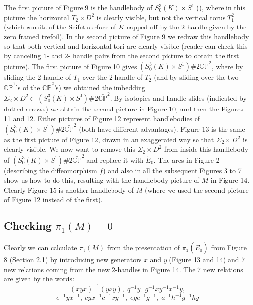 \documentclass[11pt]{amsart}
\begin{document}
The first picture of Figure 9 is the handlebody of $S^{3}_{0}(K) \times S^{1}$ (\cite{a2}), where in this picture the horizontal $T_{2}\times D^2$ is clearly visible, but not the vertical torus $T^{2}_{1}$ (which consits of the Seifet surface of $K$ capped off by the $2$-handle given by the zero framed trefoil). In the second picture of Figure 9 we redraw this handlebody so that both vertical and horizontal tori are clearly visible (reader can check this by canceling $1$- and $2$- handle pairs from the second picture to obtain the first picture).  The first picture of Figure 10  gives $(S^{3}_{0}(K) \times S^{1} )\# 2\bar{{{\mathbb C}}{{\mathbb P}}}^2$, where by sliding the $2$-handle of $T_{1}$ over the $2$-handle of $T_{2}$ (and by sliding over the two $\bar{{{{\mathbb C}}{{\mathbb P}}}}^{1}$'s of the $\bar{{{{\mathbb C}}{{\mathbb P}}}}^{2}$'s) we obtained the imbedding  $\Sigma_{2}\times D^2 \subset (S^{3}_{0}(K) \times S^{1} )\# 2\bar{{{\mathbb C}}{{\mathbb P}}}^2$. By isotopies and handle slides (indicated by dotted arrows) we obtain the second picture in Figure 10, and then the Figures 11 and 12. Either  pictures of Figure 12 represent handlebodies of $(S^{3}_{0}(K) \times S^{1} )\# 2\bar{{{\mathbb C}}{{\mathbb P}}}^2$ (both have different advantages).  Figure 13 is the same as the first picture of Figure 12, drawn in an exaggerated way so that $\Sigma_{2} \times D^2$ is clearly visible. We now want to remove this  $\Sigma_{2} \times D^2$  from inside this handlebody of $(S^{3}_{0}(K) \times S^{1} )\# 2\bar{{{\mathbb C}}{{\mathbb P}}}^2$ and replace it with $\tilde{E_{0}}$. The arcs in Figure 2 (describing the diffeomorphism $f$) and also in all the subsequent Figures 3 to 7 show us how to do this, resulting with the handlebody picture of $M$ in Figure 14. Clearly Figure 15 is another handlebody of $M$ (where we used the second picture of Figure 12 instead of the first). 

\subsection{ Checking $ \pi_{1}(M)=0 $}

Clearly we can calculate  $ \pi_{1}(M)$ from the presentation of $ \pi_{1}(\tilde{E_{0}}) $ from Figure 8 (Section 2.1) by introducing new generators $x$ and $y$ (Figure 13 and 14) and $7$ new relations coming from the new $2$-handles in Figure 14. The $7$ new relations are given by the words:
$$(xyx)^{-1}(yxy),\; q^{-1}y,\;  g^{-1}xy^{-1}x^{-1}y,$$$$ e^{-1}yx^{-1},\; cyx^{-1}c^{-1}xy^{-1},\; ege^{-1}g^{-1},\; a^{-1}h^{-1}g^{-1}hg$$
\end{document}
